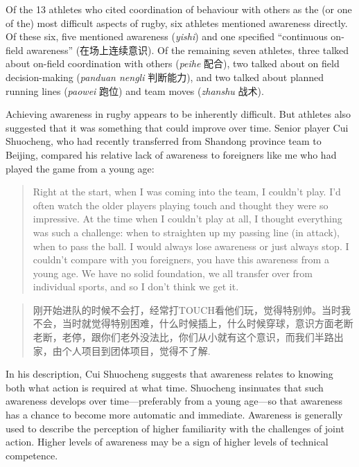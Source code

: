 \begin{CJK}{UTF8}{gbsn}
Of the 13 athletes who cited coordination of behaviour with others as the (or one of the) most difficult aspects of rugby,  six athletes mentioned awareness directly.  Of these six, five mentioned awareness (\textit{yishi}) and one specified ``continuous on-field awareness'' (在场上连续意识).  Of the remaining seven athletes, three talked about on-field coordination with others (\textit{peihe} 配合), two talked about on field decision-making (\textit{panduan nengli} 判断能力), and two talked about planned running lines (\textit{paowei} 跑位) and team moves (\textit{zhanshu} 战术).

Achieving awareness in rugby appears to be inherently difficult.  But athletes also suggested that it was something that could improve over time.  Senior player Cui Shuocheng, who had recently transferred from Shandong province team to Beijing, compared his relative lack of awareness to foreigners like me who had played the game from a young age:

    \begin{quote}
      Right at the start, when I was coming into the team, I couldn't play. I'd often watch the older players playing touch and thought they were so impressive.  At the time when I couldn't play at all, I thought everything was such a challenge: when to straighten up my passing line (in attack), when to pass the ball.  I would always lose awareness or just always stop. I couldn't compare with you foreigners, you have this awareness from a young age.  We have no solid foundation, we all transfer over from individual sports, and so I don't think we get it.
    \end{quote}

    \begin{quote}
      刚开始进队的时候不会打，经常打TOUCH看他们玩，觉得特别帅。当时我不会，当时就觉得特别困难，什么时候插上，什么时候穿球，意识方面老断老断，老停，跟你们老外没法比，你们从小就有这个意识，而我们半路出家，由个人项目到团体项目，觉得不了解.
    \end{quote}

In his description, Cui Shuocheng suggests that awareness relates to knowing both what action is required at what time.  Shuocheng insinuates that such awareness develops over time---preferably from a young age---so that awareness has a chance to become more automatic and immediate.  Awareness is generally used to describe the perception of higher familiarity with the challenges of joint action. Higher levels of awareness may be a sign of higher levels of technical competence.




\end{CJK}
